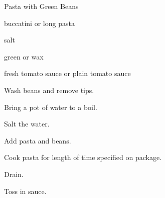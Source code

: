 \begin{recipe}{Pasta with Green Beans}{}{}

\begin{ingredients}
\item buccatini or long pasta
\item salt
\item green or wax 
\item fresh tomato sauce or plain tomato sauce
\end{ingredients}

\begin{directions}
\item Wash beans and remove tips.
\item Bring a pot of water to a boil.
\item Salt the water.
\item Add pasta and beans.
\item Cook pasta for length of time specified on package.
\item Drain.
\item Toss in sauce.
\end{directions}

\end{recipe}

